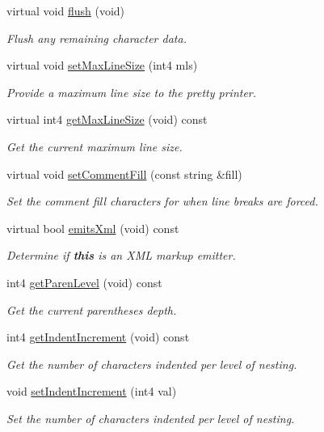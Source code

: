 \begin{DoxyCompactItemize}
virtual void \mbox{\hyperlink{class_emit_xml_a4266748416715606d0028e2aec90dce8}{flush}} (void)
\begin{DoxyCompactList}\small\item\em Flush any remaining character data. \end{DoxyCompactList}\item 
virtual void \mbox{\hyperlink{class_emit_xml_a037f97e86e503c8f2cf61faf5f510ec2}{set\+Max\+Line\+Size}} (int4 mls)
\begin{DoxyCompactList}\small\item\em Provide a maximum line size to the pretty printer. \end{DoxyCompactList}\item 
virtual int4 \mbox{\hyperlink{class_emit_xml_a3867bff6084118990799e3d9a2c1eb00}{get\+Max\+Line\+Size}} (void) const
\begin{DoxyCompactList}\small\item\em Get the current maximum line size. \end{DoxyCompactList}\item 
virtual void \mbox{\hyperlink{class_emit_xml_a51e2d9c79cebe75ed8e33bb7513d86cf}{set\+Comment\+Fill}} (const string \&fill)
\begin{DoxyCompactList}\small\item\em Set the comment fill characters for when line breaks are forced. \end{DoxyCompactList}\item 
virtual bool \mbox{\hyperlink{class_emit_xml_ad73a5d828fc7cd70f1e9ec1e6afad1fa}{emits\+Xml}} (void) const
\begin{DoxyCompactList}\small\item\em Determine if {\bfseries{this}} is an X\+ML markup emitter. \end{DoxyCompactList}\item 
int4 \mbox{\hyperlink{class_emit_xml_a3b617734f88c3993693de9a3b62027b4}{get\+Paren\+Level}} (void) const
\begin{DoxyCompactList}\small\item\em Get the current parentheses depth. \end{DoxyCompactList}\item 
int4 \mbox{\hyperlink{class_emit_xml_adf09a6bd87079c060b49a848514c79ae}{get\+Indent\+Increment}} (void) const
\begin{DoxyCompactList}\small\item\em Get the number of characters indented per level of nesting. \end{DoxyCompactList}\item 
void \mbox{\hyperlink{class_emit_xml_a969e2ff4d893610fdb54d6895d7a741f}{set\+Indent\+Increment}} (int4 val)
\begin{DoxyCompactList}\small\item\em Set the number of characters indented per level of nesting. \end{DoxyCompactList}\end{DoxyCompactItemize}
